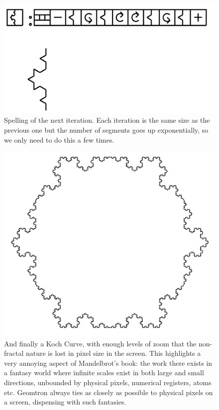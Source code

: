 \documentclass[11pt]{book}
\begin{document}
\begin{figure}

\includegraphics[width=\linewidth]{../figures/koch2.png}

\caption{Spelling of the next iteration.  Each iteration is the same size as the previous one but the number of segments goes up exponentially, so we only need to do this a few times.}
\end{figure}


\begin{figure}

\includegraphics[width=\linewidth]{../figures/koch3.png}

\caption{And finally a Koch Curve, with enough levels of zoom that the non-fractal nature is lost in pixel size in the screen.  This highlights a very annoying aspect of Mandelbrot's book: the work there exists in a fantasy world where infinite scales exist in both large and small directions, unbounded by physical pixels, numerical registers, atoms etc.  Geomtron always ties as closely as possible to physical pixels on a screen, dispensing with such fantasies.}
\end{figure}
\end{document}
